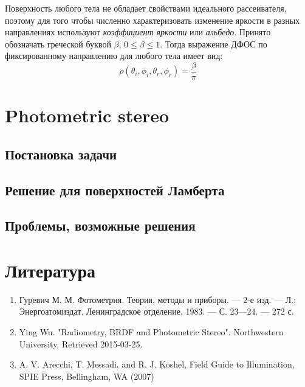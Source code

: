 \documentclass[12pt]{article}
\begin{document}
Поверхность любого тела не обладает свойствами идеального рассеивателя,
поэтому для того чтобы численно характеризовать изменение яркости
в разных направлениях используют \textit{коэффициент яркости} или \textit{альбедо}.
Принято обозначать греческой буквой $\beta$, $0\leq\beta\leq1$.
Тогда выражение ДФОС по фиксированному направлению для любого тела имеет вид:
\begin{equation}
  \rho(\theta_i,\phi_i,\theta_r,\phi_r)=\frac{\beta}{\pi}
\end{equation}


\section{Photometric stereo}

\subsection{Постановка задачи}
\subsection{Решение для поверхностей Ламберта}
\subsection{Проблемы, возможные решения}

\section{Литература}
\begin{enumerate}
  \item Гуревич М. М. Фотометрия. Теория, методы и приборы. — 2-е изд. — Л.: Энергоатомиздат. Ленинградское отделение, 1983. — С. 23—24. — 272 с.
  \item Ying Wu. "Radiometry, BRDF and Photometric Stereo". Northwestern University. Retrieved 2015-03-25.
  \item A. V. Arecchi, T. Messadi, and R. J. Koshel, Field Guide to Illumination, SPIE Press, Bellingham, WA (2007)
\end{enumerate}
\end{document}
